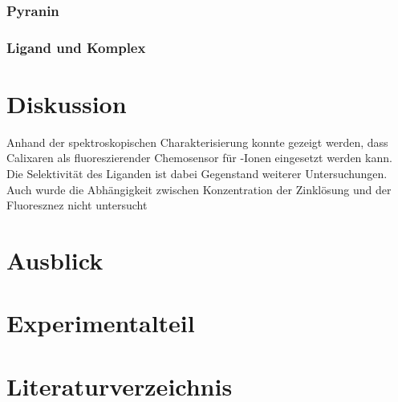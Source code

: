 \documentclass[12pt,a4paper]{report}
\begin{document}
	\subsection{Pyranin}
	\subsection{Ligand und Komplex}
	\chapter{Diskussion}
	Anhand der spektroskopischen Charakterisierung konnte gezeigt werden, dass Calixaren als fluoreszierender Chemosensor für -Ionen eingesetzt werden kann. Die Selektivität des Liganden ist dabei Gegenstand weiterer Untersuchungen. Auch wurde die Abhängigkeit zwischen Konzentration der Zinklösung und der Fluoresznez nicht untersucht
	\chapter{Ausblick}
	\chapter{Experimentalteil}
	\chapter{Literaturverzeichnis}
\end{document}
